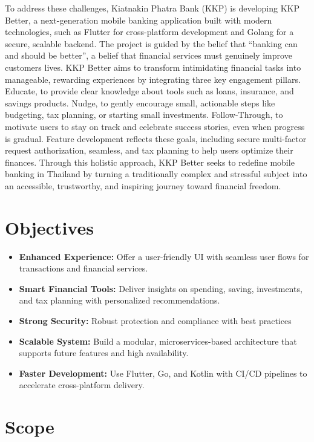 \documentclass[12pt,oneside,openright,a4paper]{cpe-english-project}
\begin{document}
To address these challenges, Kiatnakin Phatra Bank (KKP) is developing
KKP Better, a next-generation mobile banking application built with
modern technologies, such as Flutter for cross-platform development and
Golang for a secure, scalable backend. The project is guided by the
belief that ``banking can and should be better'', a belief that
financial services must genuinely improve customers\textquotesingle{}
lives. KKP Better aims to transform intimidating financial tasks into
manageable, rewarding experiences by integrating three key engagement
pillars. Educate, to provide clear knowledge about tools such as loans,
insurance, and savings products. Nudge, to gently encourage small,
actionable steps like budgeting, tax planning, or starting small
investments. Follow-Through, to motivate users to stay on track and
celebrate success stories, even when progress is gradual. Feature
development reflects these goals, including secure multi-factor request
authorization, seamless, and tax planning to help users optimize their
finances. Through this holistic approach, KKP Better seeks to redefine
mobile banking in Thailand by turning a traditionally complex and
stressful subject into an accessible, trustworthy, and inspiring journey
toward financial freedom.

\section{Objectives}

\begin{itemize}
\item
  \textbf{Enhanced Experience:} Offer a user-friendly UI with seamless
  user flows for transactions and financial services.
\item
  \textbf{Smart Financial Tools:} Deliver insights on spending, saving,
  investments, and tax planning with personalized recommendations.
\item
  \textbf{Strong Security:} Robust protection and compliance with best
  practices
\item
  \textbf{Scalable System:} Build a modular, microservices-based
  architecture that supports future features and high availability.
\item
  \textbf{Faster Development:} Use Flutter, Go, and Kotlin with CI/CD
  pipelines to accelerate cross-platform delivery.
\end{itemize}

\section{Scope}
\end{document}
